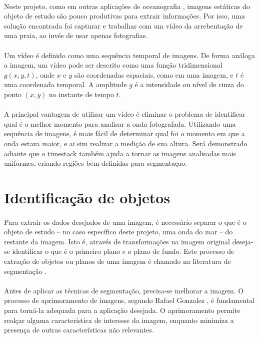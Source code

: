 \paragraph{}Neste projeto, como em outras aplicações de oceanografia \cite{Jahne02} \cite{Holland97}, imagens estáticas do objeto de estudo são pouco produtivas para extrair informações. Por isso, uma solução encontrada foi capturar e trabalhar com um vídeo da arrebentação de uma praia, ao invés de usar apenas fotografias. 
\paragraph{}Um vídeo é definido como uma sequência temporal de imagens. De forma análoga a imagem, um vídeo pode ser descrito como uma função tridimensional \(g(x,y,t)\), onde \(x\) e \(y\) são coordenadas espaciais, como em uma imagem, e \(t\) é uma coordenada temporal. A amplitude \(g\) é a intensidade ou nível de cinza do ponto \((x,y)\) no instante de tempo \(t\).
\paragraph{}A principal vantagem de utilizar um vídeo é eliminar o problema de identificar qual é o melhor momento para analisar a onda fotografada. Utilizando uma sequência de imagens, é mais fácil de determinar qual foi o momento em que a onda estava maior, e ai sim realizar a medição de sua altura. Será demonstrado adiante que o timestack também ajuda a tornar as imagens analisadas mais uniformes, criando regiões bem definidas para segmentaçao. 
\section{Identificação de objetos} %
\paragraph{}Para extrair os dados desejados de uma imagem, é necessário separar o que é o objeto de estudo -- no caso específico deste projeto, uma onda do mar -- do restante da imagem. Isto é, através de transformações na imagem original deseja-se identificar o que é o primeiro plano e o plano de fundo. Este processo de extração de objetos ou planos de uma imagem é chamado na literatura de segmentação \cite{Gonzalez92}.
\paragraph{}Antes de aplicar as técnicas de segmentação, precisa-se melhorar a imagem. O processo de aprimoramento de imagens, segundo Rafael Gonzalez \cite{Gonzalez92}, é fundamental para torná-la adequada para a aplicação desejada. O aprimoramento permite realçar alguma característica de interesse da imagem, enquanto minimiza a presença de outras características não relevantes.
